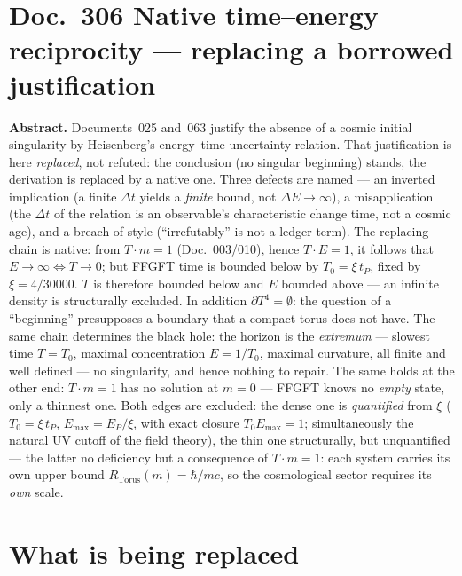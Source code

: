 
\section*{Doc.~306 \quad Native time--energy reciprocity --- replacing a borrowed justification}

\begingroup\small\noindent
\textbf{Abstract.} Documents~025 and~063 justify the absence of a cosmic initial singularity by
Heisenberg's energy--time uncertainty relation. That justification is here \emph{replaced}, not
refuted: the conclusion (no singular beginning) stands, the derivation is replaced by a native
one. Three defects are named --- an inverted implication (a finite $\Delta t$ yields a
\emph{finite} bound, not $\Delta E\to\infty$), a misapplication (the $\Delta t$ of the relation is
an observable's characteristic change time, not a cosmic age), and a breach of style
(\enquote{irrefutably} is not a ledger term). The replacing chain is native: from $T\cdot m = 1$
(Doc.~003/010), hence $T\cdot E = 1$, it follows that $E\to\infty \Leftrightarrow T\to 0$; but
FFGFT time is bounded below by $T_0 = \xi\,t_P$, fixed by
$\xi = 4/30000$. $T$ is therefore bounded below and $E$ bounded above --- an infinite density is
structurally excluded. In addition $\partial T^4 = \emptyset$: the question of a
\enquote{beginning} presupposes a boundary that a compact torus does not have. The same chain
determines the black hole: the horizon is the \emph{extremum} --- slowest time $T=T_0$, maximal
concentration $E=1/T_0$, maximal curvature, all finite and well defined --- no singularity, and
hence nothing to repair. The same holds at the other end: $T\cdot m = 1$ has no solution at $m=0$ --- FFGFT knows no \emph{empty} state, only a thinnest one. Both edges are excluded: the dense one is \emph{quantified} from $\xi$ ($T_0=\xi\,t_P$, $E_\text{max}=E_P/\xi$, with exact closure $T_0 E_\text{max}=1$; simultaneously the natural UV cutoff of the field theory), the thin one structurally, but unquantified --- the latter no deficiency but a consequence of $T\cdot m=1$: each system carries its own upper bound $R_\text{Torus}(m)=\hbar/mc$, so the cosmological sector requires its \emph{own} scale.
\par\endgroup

\medskip

\section{What is being replaced}

